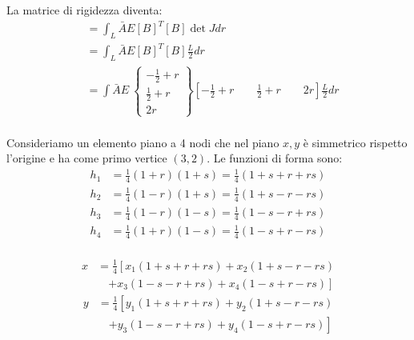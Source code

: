 \begin{esempioBox}
La matrice di rigidezza diventa:
\begin{align*}
  [K]   &=  \int_L \bar{A}E[B]^T[B]  \det J dr\\
         &=  \int_L \bar{A}E[B]^T[B]  \frac{L}{2} dr\\  
    &=  \int \bar{A}E\   \begin{Bmatrix}
        -\frac{1}{2}+r\\ \frac{1}{2}+r \\ 2r \end{Bmatrix} \left[  -\frac{1}{2}+r\qquad \frac{1}{2}+r \qquad 2r \right]\frac{L}{2}
    dr\\
\end{align*}
    
\end{esempioBox}

\begin{esempioBox}
    Consideriamo un elemento piano a 4 nodi che nel piano $x,y$ è simmetrico rispetto l'origine e ha come primo vertice $(3,2)$. Le funzioni di forma sono:
    \begin{align*}
    h_1&=\frac{1}{4}(1+r)(1+s)=\frac{1}{4}(1+s+r+rs)\\
    h_2&=\frac{1}{4}(1-r)(1+s)=\frac{1}{4}(1+s-r-rs)\\
    h_3&=\frac{1}{4}(1-r)(1-s)=\frac{1}{4}(1-s-r+rs)\\
    h_4&=\frac{1}{4}(1+r)(1-s)=\frac{1}{4}(1-s+r-rs)\\
\end{align*}


\begin{equation*}
\begin{split}
x &= \frac{1}{4}\left[x_1(1+s+r+rs) + x_2(1+s-r-rs)\right.\\
&\quad\left. + x_3(1-s-r+rs) + x_4(1-s+r-rs)\right]
\end{split}
\end{equation*}
\begin{equation*}
\begin{split}
y &= \frac{1}{4}\left[y_1(1+s+r+rs) + y_2(1+s-r-rs)\right.\\
&\quad\left. + y_3(1-s-r+rs) + y_4(1-s+r-rs)\right]
\end{split}
\end{equation*}


\end{esempioBox}
